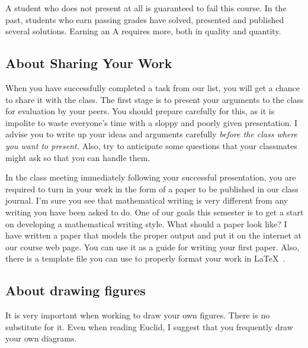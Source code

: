 \documentclass{tufte-handout}
\theoremstyle{definition}
\begin{document}
A student who does not present at all is guaranteed to fail this course.
In the past, students who earn passing grades have solved, presented and published several solutions.
Earning an A requires more, both in quality and quantity.

\subsection*{About Sharing Your Work}
When you have successfully completed a task from our list, you will get a chance to share it with the class.
The first stage is to present your arguments to the class for evaluation by your peers.
You should prepare carefully for this, as it is impolite to waste everyone's time with a sloppy and poorly given presentation.
I advise you to write up your ideas and arguments carefully \emph{before the class where you want to present.}
Also, try to anticipate some questions that your classmates might ask so that you can handle them.




In the class meeting immediately following your successful presentation, you are required to turn in your work in the form of a paper to be published in our class journal.
I'm sure you see that mathematical writing is very different from any writing you have been asked to do.
One of our goals this semester is to get a start on developing a mathematical writing style.
What should a paper look like?
I have written a paper that models the proper output and put it on the internet at our course web page.
You can use it as a guide for writing your first paper.
Also, there is a template file you can use to properly format your work in \LaTeX\ .


\subsection*{About drawing figures} 
It is very important when working to draw your own figures. 
There is no substitute for it.
Even when reading Euclid, I suggest that you frequently draw your own diagrams.
\end{document}
